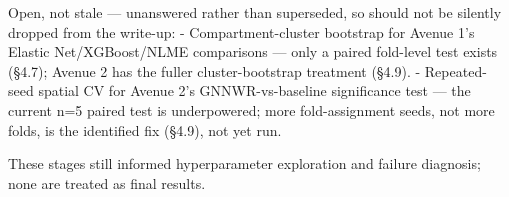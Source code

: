 \documentclass[11pt,a4paper]{report}
\begin{document}
Open, not stale — unanswered rather than superseded, so should not be silently dropped from the write-up:
- Compartment-cluster bootstrap for Avenue 1's Elastic Net/XGBoost/NLME comparisons — only a paired fold-level test exists (§4.7); Avenue 2 has the fuller cluster-bootstrap treatment (§4.9).
- Repeated-seed spatial CV for Avenue 2's GNNWR-vs-baseline significance test — the current n=5 paired test is underpowered; more fold-assignment seeds, not more folds, is the identified fix (§4.9), not yet run.

These stages still informed hyperparameter exploration and failure diagnosis; none are treated as final results.
\end{document}
